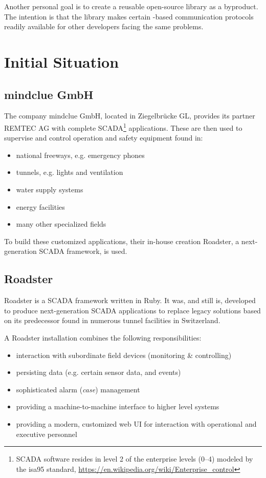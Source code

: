 Another personal goal is to create a reusable open-source library as a
byproduct. The intention is that the library makes certain \zmq-based
communication protocols readily available for other developers facing the same
problems.

\section{Initial Situation}

\subsection{mindclue GmbH}
The company mindclue GmbH, located in Ziegelbr\"ucke GL, provides its partner
REMTEC AG with complete \gls{SCADA}\footnote{SCADA software resides in level 2 of the enterprise levels (0--4) modeled by the \gls{isa95} standard, \url{https://en.wikipedia.org/wiki/Enterprise_control}} applications. These are then used to
supervise and control operation and safety equipment found in:

\begin{itemize}
\item national freeways, e.g. emergency phones
\item tunnels, e.g. lights and ventilation
\item water supply systems
\item energy facilities
\item many other specialized fields
\end{itemize}

To build these customized applications, their in-house creation
Roadster, a next-generation SCADA framework, is used.

\subsection{Roadster}
Roadster is a SCADA framework written in Ruby. It was, and still
is, developed to produce next-generation SCADA applications to replace legacy
solutions based on its predecessor found in numerous tunnel
facilities in Switzerland.

A Roadster installation combines the following responsibilities:

\begin{itemize}
	\item interaction with subordinate field devices (monitoring \& controlling)
	\item persisting data (e.g. certain sensor data, and events)
	\item sophisticated alarm (\emph{case}) management
	\item providing a machine-to-machine interface to higher level systems
	\item providing a modern, customized web UI for interaction with operational and executive personnel
\end{itemize}


